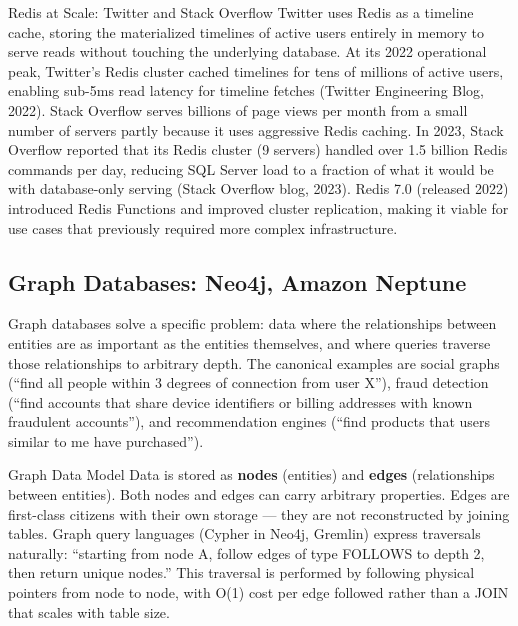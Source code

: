 \documentclass[11pt,a4paper]{article}
\begin{document}
\begin{industrybox}{Redis at Scale: Twitter and Stack Overflow}
Twitter uses Redis as a timeline cache, storing the materialized timelines of active users entirely in memory to serve reads without touching the underlying database. At its 2022 operational peak, Twitter's Redis cluster cached timelines for tens of millions of active users, enabling sub-5ms read latency for timeline fetches (Twitter Engineering Blog, 2022). Stack Overflow serves billions of page views per month from a small number of servers partly because it uses aggressive Redis caching. In 2023, Stack Overflow reported that its Redis cluster (9 servers) handled over 1.5 billion Redis commands per day, reducing SQL Server load to a fraction of what it would be with database-only serving (Stack Overflow blog, 2023). Redis 7.0 (released 2022) introduced Redis Functions and improved cluster replication, making it viable for use cases that previously required more complex infrastructure.
\end{industrybox}

\subsection{Graph Databases: Neo4j, Amazon Neptune}

Graph databases solve a specific problem: data where the relationships between entities are as important as the entities themselves, and where queries traverse those relationships to arbitrary depth. The canonical examples are social graphs (``find all people within 3 degrees of connection from user X''), fraud detection (``find accounts that share device identifiers or billing addresses with known fraudulent accounts''), and recommendation engines (``find products that users similar to me have purchased'').

\begin{termbox}{Graph Data Model}
Data is stored as \textbf{nodes} (entities) and \textbf{edges} (relationships between entities). Both nodes and edges can carry arbitrary properties. Edges are first-class citizens with their own storage --- they are not reconstructed by joining tables. Graph query languages (Cypher in Neo4j, Gremlin) express traversals naturally: ``starting from node A, follow edges of type FOLLOWS to depth 2, then return unique nodes.'' This traversal is performed by following physical pointers from node to node, with O(1) cost per edge followed rather than a JOIN that scales with table size.
\end{termbox}
\end{document}
